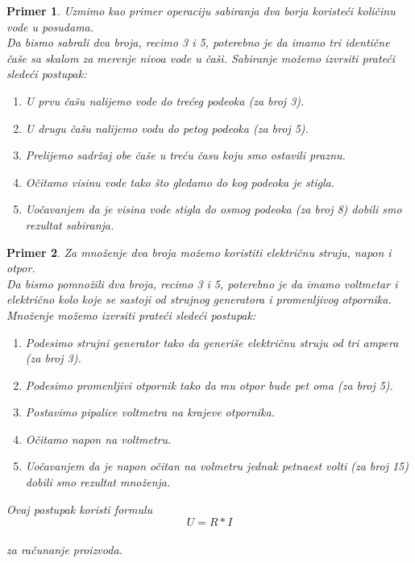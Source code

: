 \documentclass[a4paper]{article}
\newtheorem{primer}{Primer}[section]
\begin{document}
{\bigskip

    \begin{primer}
    Uzmimo kao primer operaciju sabiranja dva borja koristeći količinu vode u posudama.\\
    Da bismo sabrali dva broja, recimo 3 i 5, poterebno je da imamo tri identične čaše sa skalom za merenje nivoa vode u čaši. Sabiranje možemo izvrsiti prateći sledeći postupak:\begin{enumerate}
        \item U prvu čašu nalijemo vode do trećeg podeoka (za broj 3).
        \item U drugu čašu nalijemo vodu do petog podeoka (za broj 5).
        \item Prelijemo sadržaj obe čaše u treću času koju smo ostavili praznu.
        \item Očitamo visinu vode tako što gledamo do kog podeoka je stigla.
        \item Uočavanjem da je visina vode stigla do osmog podeoka (za broj 8) dobili smo rezultat sabiranja.
    \end{enumerate}
    \end{primer}
    
\bigskip

    \begin{primer}
    Za množenje dva broja možemo koristiti električnu struju, napon i otpor.\\
    Da bismo pomnožili dva broja, recimo 3 i 5, poterebno je da imamo voltmetar i električno kolo koje se sastoji od strujnog generatora i promenljivog otpornika. Množenje možemo izvrsiti prateći sledeći postupak:\begin{enumerate}
        \item Podesimo strujni generator tako da generiše električnu struju od tri ampera (za broj 3).
        \item Podesimo promenljivi otpornik tako da mu otpor bude pet oma (za broj 5).
        \item Postavimo pipalice voltmetra na krajeve otpornika.
        \item Očitamo napon na voltmetru.
        \item Uočavanjem da je napon očitan na volmetru jednak petnaest volti (za broj 15) dobili smo rezultat množenja.
    \end{enumerate}
    \centering Ovaj postupak koristi formulu
    \centering $$ U = R*I $$\\
    \centering za računanje proizvoda.
    \end{primer}


}
\end{document}
